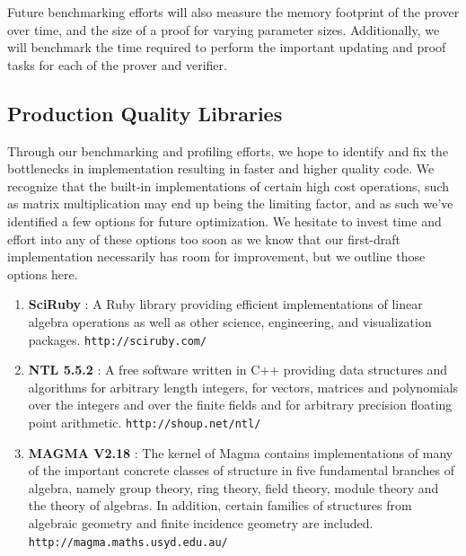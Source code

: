 \documentclass[11pt, letterpaper, oneside]{article}
\begin{document}
	Future benchmarking efforts will also measure the memory footprint of the prover over time, and the size of a proof for varying parameter sizes. Additionally, we will benchmark the time required to perform the important updating and proof tasks for each of the prover and verifier. 
	


	\subsection{ Production Quality Libraries }
	
	Through our benchmarking and profiling efforts, we hope to identify and fix the bottlenecks in implementation resulting in faster and higher quality code.
	We recognize that the built-in implementations of certain high cost operations, such as matrix multiplication may end up being the limiting factor, and as such we've identified a few options for future optimization.
	We hesitate to invest time and effort into any of these options too soon as we know that our first-draft implementation necessarily has room for improvement, but we outline those options here.

	\begin{enumerate}
	\item \textbf{SciRuby} : A Ruby library providing efficient implementations of linear algebra operations as well as other science, engineering, and visualization packages. \texttt{http://sciruby.com/}
	\item \textbf{NTL 5.5.2} : A free software written in C++ providing data structures and algorithms for arbitrary length integers, for vectors, matrices and polynomials over the integers and over the finite fields and for arbitrary precision floating point arithmetic. \texttt{http://shoup.net/ntl/}
	\item \textbf{MAGMA V2.18} : The kernel of Magma contains implementations of many of the important concrete classes of structure in five fundamental branches of algebra, namely group theory, ring theory, field theory, module theory and the theory of algebras.
	In addition, certain families of structures from algebraic geometry and finite incidence geometry are included. \texttt{http://magma.maths.usyd.edu.au/}
	\end{enumerate}

	
\end{document}

